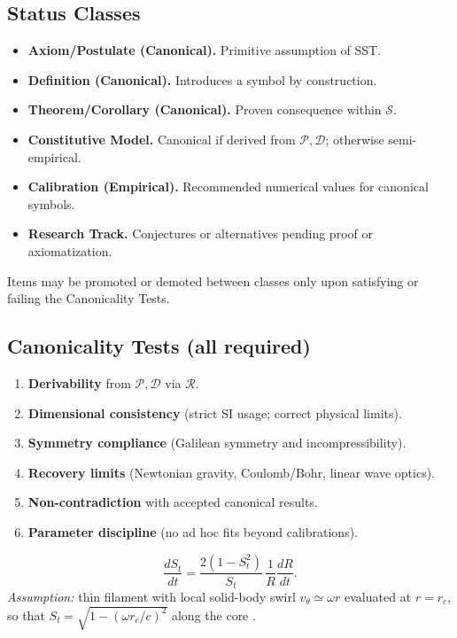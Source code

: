 \documentclass[10pt,reprint,aps,onecolumn,nofootinbib]{revtex4-2}
\begin{document}
    \subsection*{Status Classes}
    \begin{itemize}
    \item \textbf{Axiom/Postulate (Canonical).} Primitive assumption of SST.
    \item \textbf{Definition (Canonical).} Introduces a symbol by construction.
    \item \textbf{Theorem/Corollary (Canonical).} Proven consequence within $\mathcal{S}$.
    \item \textbf{Constitutive Model.} Canonical if derived from $\mathcal{P},\mathcal{D}$; otherwise semi-empirical.
    \item \textbf{Calibration (Empirical).} Recommended numerical values for canonical symbols.
    \item \textbf{Research Track.} Conjectures or alternatives pending proof or axiomatization.
    \end{itemize}
    Items may be promoted or demoted between classes only upon satisfying or failing the Canonicality Tests.

    \subsection*{Canonicality Tests (all required)}
    \begin{enumerate}
    \item \textbf{Derivability} from $\mathcal{P},\mathcal{D}$ via $\mathcal{R}$.
    \item \textbf{Dimensional consistency} (strict SI usage; correct physical limits).
    \item \textbf{Symmetry compliance} (Galilean symmetry and incompressibility).
    \item \textbf{Recovery limits} (Newtonian gravity, Coulomb/Bohr, linear wave optics).
    \item \textbf{Non-contradiction} with accepted canonical results.
    \item \textbf{Parameter discipline} (no ad hoc fits beyond calibrations).
    \end{enumerate}
    \begin{tcolorbox}[title=Corollary: Clock--Radius Transport]
    \[
        \frac{dS_t}{dt}=\frac{2(1-S_t^2)}{S_t}\,\frac{1}{R}\frac{dR}{dt}.
    \]
    \textit{Assumption:} thin filament with local solid-body swirl $v_\theta\simeq \omega r$ evaluated at $r=r_c$, so that
    $S_t=\sqrt{1-(\omega r_c/c)^2}$ along the core \cite{Batchelor1967,Saffman1992}. %
    \end{tcolorbox}
\end{document}
